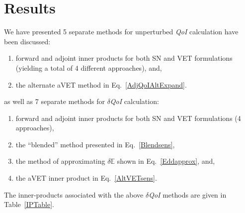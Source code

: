 \documentclass[12pt]{report}
\newcommand{\Edd}{\mathbb{E}}
\newcommand{\qoi}{{\it QoI}\xspace}
\begin{document}
\section{Results}

We have presented 5 separate methods for unperturbed \qoi calculation have been discussed: 
\begin{enumerate}
\item forward and adjoint inner products for both SN and VET formulations (yielding a total of 4 different approaches), and,
\item the alternate aVET method in Eq.~\eqref{AdjQoIAltExpand}.
\end{enumerate} 
as well as 7 separate methods for $\delta$\qoi calculation: 
\begin{enumerate}
\item forward and adjoint inner products for both SN and VET formulations (4 approaches),
\item the ``blended'' method presented in Eq.~\eqref{Blendsens},
\item the method of approximating $\delta \Edd$ shown in Eq.~\eqref{Eddapprox}, and,
\item the aVET inner product in  Eq.~\eqref{AltVETsens}.
\end{enumerate} 
The inner-products associated with the above $\delta$\qoi methods are given in Table~\ref{IPTable}.
\end{document}
